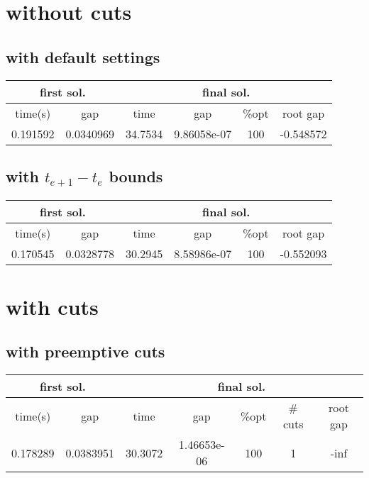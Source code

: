 \documentclass{article}
\begin{document}
\section{without cuts}
\subsection{with default settings}
\begin{center}
	\begin{tabular}{|cc|cccc|}
	\hline
       \multicolumn{2}{|c|}{first sol.}& \multicolumn{4}{c|}{final sol.}\\ 
	\hline 
  time(s) & gap & time & gap &\%opt  & root gap\\ 
 \hline 
0.191592 & 0.0340969 & 34.7534 & 9.86058e-07 & 100 & -0.548572\\ 
\hline 
\end{tabular}
\end{center}
\subsection{with $t_{e+1}-t_e$ bounds}
\begin{center}
	\begin{tabular}{|cc|cccc|}
	\hline
       \multicolumn{2}{|c|}{first sol.}& \multicolumn{4}{c|}{final sol.}\\ 
	\hline 
  time(s) & gap & time & gap &\%opt  & root gap\\ 
 \hline 
0.170545 & 0.0328778 & 30.2945 & 8.58986e-07 & 100 & -0.552093\\ 
\hline 
\end{tabular}
\end{center}
\section{with cuts}
\subsection{with preemptive cuts}
\begin{center}
	\begin{tabular}{|cc|ccccc|}
	\hline
     \multicolumn{2}{|c|}{first sol.}& \multicolumn{5}{c|}{final sol.}\\ 
	\hline 
  time(s) & gap & time & gap &\%opt &  \# cuts & root gap\\ 
 \hline 
0.178289 & 0.0383951 & 30.3072 & 1.46653e-06 & 100 & 1 & -inf\\ 
\hline 
\end{tabular}
\end{center}
\end{document}
